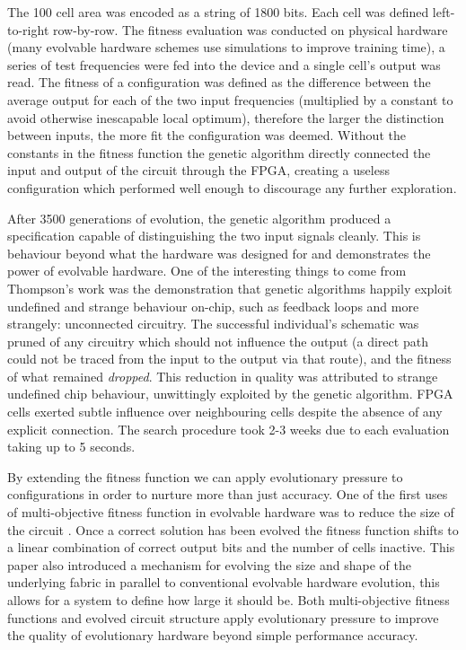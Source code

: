 The 100 cell area was encoded as a string of 1800 bits. Each cell was defined
left-to-right row-by-row. The fitness evaluation was conducted on physical hardware
(many evolvable hardware schemes use simulations to improve training time), a series of test frequencies
were fed into the device and a single cell's output was read. The fitness of a configuration
was defined as the difference between the average output for each of the two input frequencies
(multiplied by a constant to avoid otherwise inescapable local optimum), therefore the larger
the distinction between inputs, the more fit the configuration was deemed. Without the constants in the
fitness function the genetic algorithm directly connected the input and output of
the circuit through the FPGA, creating a useless configuration which performed
well enough to discourage any further exploration.

After 3500 generations of evolution, the genetic algorithm produced a specification
capable of distinguishing the two input signals cleanly. This is behaviour beyond
what the hardware was designed for and demonstrates the power of evolvable hardware. One of the
interesting things to come from Thompson's work was the demonstration that genetic
algorithms happily exploit undefined and strange behaviour on-chip, such as feedback
loops and more strangely: unconnected circuitry. The successful
individual's schematic was pruned of any circuitry which should not influence the
output (a direct path could not be traced from the input to the output via that route),
and the fitness of what remained {\em dropped}. This reduction in quality was attributed
to strange undefined chip behaviour, unwittingly exploited by the genetic algorithm.
FPGA cells exerted subtle influence over neighbouring cells despite the absence of any explicit
connection.
The search procedure took 2-3 weeks
due to each evaluation taking up to 5 seconds.

By extending the fitness function we can apply evolutionary pressure to configurations
in order to nurture more than just accuracy.
One of the first uses of multi-objective fitness function in evolvable hardware was
to reduce the size of the circuit \cite{785435}. Once a correct solution has been evolved the
fitness function shifts to a linear combination of correct output bits and
the number of cells inactive. This paper also introduced a mechanism for evolving the size
and shape of the underlying fabric in parallel to conventional evolvable hardware
evolution, this allows for a system to define
how large it should be.
Both multi-objective fitness functions and evolved circuit structure
apply evolutionary pressure to improve the quality of evolutionary hardware
beyond simple performance accuracy.

